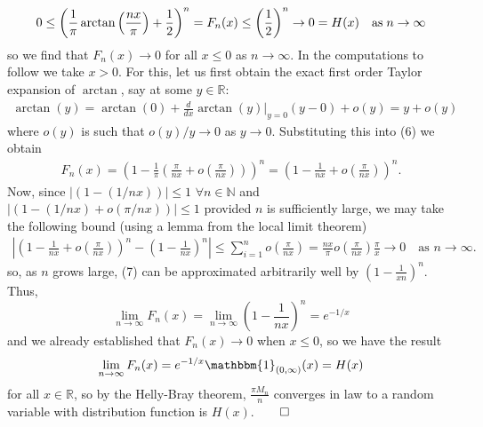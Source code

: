 \documentclass[10pt]{article}
\newcommand{\bp}[1]{\left({#1}\right)}
\newcommand{\mbb}[1]{\mathbb{#1}}
\newcommand{\1}[1]{\mathbbm{1}_{#1}}
\begin{document}
    \[0\leq \bp{\frac{1}{\pi}\arctan\bp{\frac{nx}{\pi}}+\frac{1}{2}}^n=F_n(x)\leq\bp{\frac{1}{2}}^n\rightarrow 0=H(x)\quad\text{as\;$n\rightarrow\infty$}\]
    so we find that $F_n(x)\rightarrow0$ for all $x\leq 0$ as $n\rightarrow\infty$. In the computations to follow we take $x>0$. For this, let us first obtain the exact first order Taylor expansion of $\arctan$, say at some $y\in\mbb{R}$:
    \begin{align*}
        \arctan(y)=\arctan(0)+\frac{d}{dx}\arctan(y)\big|_{y=0}(y-0)+o(y)=y+o(y)
    \end{align*}
    where $o(y)$ is such that $o(y)/y\rightarrow 0$ as $y\rightarrow 0$. Substituting this into (6) we obtain
    \begin{align*}
        F_n(x)=\bp{1-\frac{1}{\pi}\bp{\frac{\pi}{nx}+o\bp{\frac{\pi}{nx}}}}^n=\bp{1-\frac{1}{nx}+o\bp{\frac{\pi}{nx}}}^n.\tag{7}
    \end{align*}
    Now, since $|(1-(1/nx))|\leq 1$ $\forall n\in\mbb{N}$ and $|(1-(1/nx)+o(\pi/nx))|\leq 1$ provided $n$ is sufficiently large, we may take the following bound (using a lemma from the local limit theorem)
    \begin{align*}
        \left|\bp{1-\frac{1}{nx}+o\bp{\frac{\pi}{nx}}}^n-\bp{1-\frac{1}{nx}}^n\right|\leq\sum_{i=1}^no\bp{\frac{\pi}{nx}}=\frac{nx}{\pi}o\bp{\frac{\pi}{nx}}\frac{\pi}{x}\rightarrow 0\quad\text{as $n\rightarrow \infty$.}
    \end{align*}
    so, as $n$ grows large, (7) can be approximated arbitrarily well by $(1-\tfrac{1}{xn})^n$. Thus,
    \[\lim_{n\rightarrow\infty}F_n(x)=\lim_{n\rightarrow\infty}\bp{1-\frac{1}{nx}}^n=e^{-1/x}\]
    and we already established that $F_n(x)\rightarrow 0$ when $x\leq 0$, so we have the result
    \[\lim_{n\rightarrow\infty}F_n(x)=e^{-1/x}\1{(0,\infty)}(x)=H(x)\]
    for all $x\in\mbb{R}$, so by the Helly-Bray theorem, $\tfrac{\pi M_n}{n}$ converges in law to a random variable with distribution function is $H(x)$.\hfill{$\qed$}\\[5pt]
\end{document}
